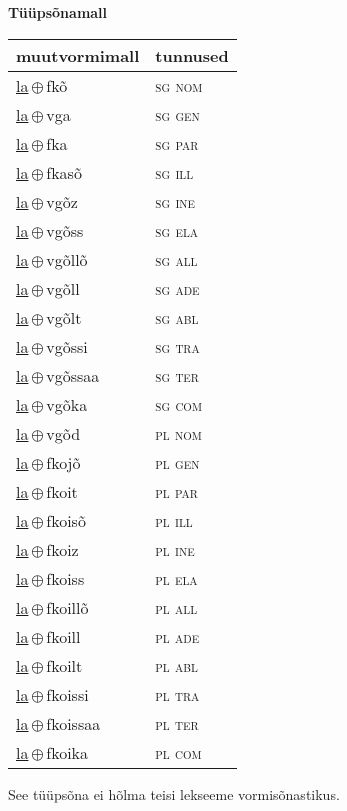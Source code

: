 

\vspace{3.5em}
\noindent \begin{minipage}{\textwidth}
\noindent \textbf{Tüüpsõnamall \,}\\

\begin{sideways}
\begin{tabular}{l l}
muutvormimall & tunnused \\
\hline
\underline{la}\,$\oplus$\,fkõ & \textsc{ sg nom } \\
\underline{la}\,$\oplus$\,vga & \textsc{ sg gen } \\
\underline{la}\,$\oplus$\,fka & \textsc{ sg par } \\
\underline{la}\,$\oplus$\,fkasõ & \textsc{ sg ill } \\
\underline{la}\,$\oplus$\,vgõz & \textsc{ sg ine } \\
\underline{la}\,$\oplus$\,vgõss & \textsc{ sg ela } \\
\underline{la}\,$\oplus$\,vgõllõ & \textsc{ sg all } \\
\underline{la}\,$\oplus$\,vgõll & \textsc{ sg ade } \\
\underline{la}\,$\oplus$\,vgõlt & \textsc{ sg abl } \\
\underline{la}\,$\oplus$\,vgõssi & \textsc{ sg tra } \\
\underline{la}\,$\oplus$\,vgõssaa & \textsc{ sg ter } \\
\underline{la}\,$\oplus$\,vgõka & \textsc{ sg com } \\
\underline{la}\,$\oplus$\,vgõd & \textsc{ pl nom } \\
\underline{la}\,$\oplus$\,fkojõ & \textsc{ pl gen } \\
\underline{la}\,$\oplus$\,fkoit & \textsc{ pl par } \\
\underline{la}\,$\oplus$\,fkoisõ & \textsc{ pl ill } \\
\underline{la}\,$\oplus$\,fkoiz & \textsc{ pl ine } \\
\underline{la}\,$\oplus$\,fkoiss & \textsc{ pl ela } \\
\underline{la}\,$\oplus$\,fkoillõ & \textsc{ pl all } \\
\underline{la}\,$\oplus$\,fkoill & \textsc{ pl ade } \\
\underline{la}\,$\oplus$\,fkoilt & \textsc{ pl abl } \\
\underline{la}\,$\oplus$\,fkoissi & \textsc{ pl tra } \\
\underline{la}\,$\oplus$\,fkoissaa & \textsc{ pl ter } \\
\underline{la}\,$\oplus$\,fkoika & \textsc{ pl com } \\
\end{tabular}
\end{sideways}
\label{tab:tüüpsõnamall-lafkõ}

\end{minipage}

 
\vspace{1em}
\noindent See tüüpsõna ei hõlma teisi lekseeme vormi\-sõnastikus.
